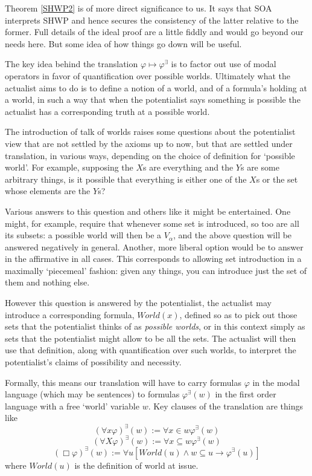 \documentclass{article}
\begin{document}
Theorem \ref{SHWP2} is of more direct significance to us. 
It says that SOA interprets SHWP and hence
secures the consistency of the latter relative to the former. 
Full details of the 
ideal proof are a little fiddly and would go beyond our needs here. 
But some idea of how things go down will be useful.

The key idea behind the translation $\varphi \mapsto \varphi^\exists$ is to factor 
out use of modal operators in favor of quantification over possible worlds. 
Ultimately what the actualist aims to do is to define a notion of a world, and of 
a formula's holding at a world, in such a way that when the potentialist says 
something is possible the actualist has a corresponding truth at a possible world.

The introduction of talk of worlds raises some questions about the potentialist 
view that are not settled by the axioms up to now, but that are settled under 
translation, in various ways, depending on the choice of definition for `possible 
world'. For example, supposing the $X$s are everything and the $Y$s are some arbitrary things, 
is it possible that everything is either one of the $X$s or the set whose elements are the $Y$s?

Various answers to this question and others like it might be entertained. One might, for example, 
require that whenever some set is introduced, so too are all its subsets: a possible world 
will then be a $V_\alpha$, and the above question will be answered negatively in general. Another, 
more liberal option would be to answer in the affirmative in all cases. This 
corresponds to allowing set introduction in a maximally `piecemeal' fashion: given 
any things, you can introduce just the set of them and nothing else.

However this question is answered by the potentialist, the actualist may introduce a corresponding 
formula, $World(x)$, defined so as to pick out those sets that the potentialist thinks of as \emph{possible worlds},
or in this context simply as sets that the potentialist might allow to be all the sets. 
The actualist will then use that definition, along with quantification over such worlds,
to interpret the potentialist's claims of possibility and necessity. 

Formally, this means our translation will have to 
carry formulas $\varphi$ in the modal language (which may be sentences) to formulas 
$\varphi^\exists(w)$ 
in the first order language with a free `world' variable $w$. Key clauses of the 
translation are things like
\[ (\forall x \varphi)^\exists(w) := \forall x \in w \varphi^\exists(w) \]
\[ (\forall X \varphi)^\exists(w) := \forall x \subseteq w \varphi^\exists(w) \]
\[ (\Box \varphi)^\exists(w) := \forall u [World(u) \wedge w \subseteq u \rightarrow \varphi^\exists(u)]\]
where $World(u)$ is the definition of world at issue. 
\end{document}
